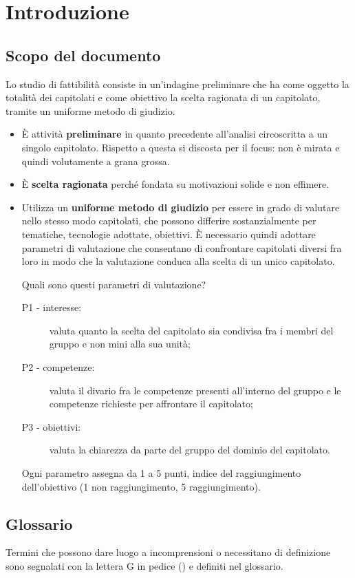 \section{Introduzione}

\subsection{Scopo del documento}
Lo studio di fattibilità consiste in un'indagine preliminare che ha come oggetto la totalità dei capitolati e come obiettivo la scelta ragionata di un capitolato, tramite un uniforme metodo di giudizio. 
\begin{itemize}
	\item È attività \textbf{preliminare} in quanto precedente all'analisi circoscritta a un singolo capitolato. Rispetto a questa si discosta per il focus: non è mirata e quindi volutamente a grana grossa. 
	\item È \textbf{scelta ragionata} perché fondata su motivazioni solide e non effimere.
	\item Utilizza un \textbf{uniforme metodo di giudizio} per essere in grado di valutare nello stesso modo capitolati, che possono differire sostanzialmente per tematiche, tecnologie adottate, obiettivi. È necessario quindi adottare parametri di valutazione che consentano di confrontare capitolati diversi fra loro in modo che la valutazione conduca alla scelta di un unico capitolato. 
	
	Quali sono questi parametri di valutazione? 
	\begin{description}
		\item[P1 - interesse:] valuta quanto la scelta del capitolato sia condivisa fra i membri del gruppo e non mini alla sua unità;
		\item[P2 - competenze:] valuta il divario fra le competenze presenti all'interno del gruppo e le competenze richieste per affrontare il capitolato;
		\item[P3 - obiettivi:] valuta la chiarezza da parte del gruppo del dominio del capitolato. 
	\end{description}
	Ogni parametro assegna da 1 a 5 punti, indice del raggiungimento dell'obiettivo (1 non raggiungimento, 5 raggiungimento).
\end{itemize}


\subsection{Glossario}
Termini che possono dare luogo a incomprensioni o necessitano di definizione sono segnalati con la lettera G in pedice (\glock{ }) e definiti nel glossario. 

